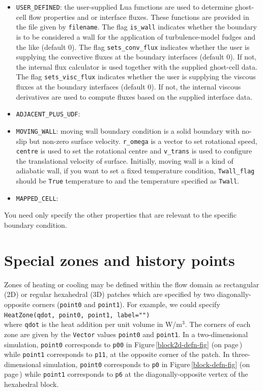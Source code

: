 \begin{itemize}
\begin{itemize}
      \item \texttt{USER\_DEFINED}: the user-supplied Lua functions are used to
        determine ghost-cell flow properties and or interface fluxes.
        These functions are provided in the file given by \texttt{filename}.
        The flag \texttt{is\_wall} indicates whether the boundary is to be considered
        a wall for the application of turbulence-model fudges and the like (default 0).
        The flag \texttt{sets\_conv\_flux} indicates whether the user is supplying
        the convective fluxes at the boundary interfaces (default 0).  
        If not, the internal flux calculator is used together with the supplied ghost-cell data.
        The flag \texttt{sets\_visc\_flux} indicates whether the user is supplying
        the viscous fluxes at the boundary interfaces (default 0).  
        If not, the internal viscous derivatives are used to compute fluxes based on the supplied interface data.
      \item \texttt{ADJACENT\_PLUS\_UDF}:
      \item \texttt{MOVING\_WALL}: moving wall boundary condition is a solid boundary with no-slip
        but non-zero surface velocity. \verb!r_omega! is a vector to set rotational speed, \verb!centre! is used to
        set the rotational centre and \verb!v_trans! is used to configure the translational velocity of surface.
        Initially, moving wall is a kind of adiabatic wall, if you want to set a fixed temperature condition,
        \verb!Twall_flag! should be \verb!True! temperature to and the temperature specified as \verb!Twall!.
      \item \texttt{MAPPED\_CELL}:
    \end{itemize}
\end{itemize}
You need only specify the other properties that are relevant to the specific boundary condition.

\bigskip
\section{Special zones and history points}
\label{sec:special-zones}
% 
Zones of heating or cooling may be defined within the flow domain as rectangular (2D) 
or regular hexahedral (3D) patches which are specified by two diagonally-opposite
corners (\verb!point0! and \verb!point1!).
For example, we could specify\\
\verb!HeatZone(qdot, point0, point1, label="")!\\
where \verb!qdot! is the heat addition per unit volume in W/m$^3$.
The corners of each zone are given by the \verb!Vector! values \verb!point0! and \verb!point1!.
In a two-dimensional simulation, 
\verb!point0! corresponds to \verb!p00! in Figure\,\ref{block2d-defn-fig} (on page\,\pageref{block2d-defn-fig}) 
while \verb!point1! corresponds to \verb!p11!, at the opposite corner of the patch.
In three-dimensional simulation, 
\verb!point0! corresponds to \verb!p0! in Figure\,\ref{block-defn-fig} (on page\,\pageref{block-defn-fig}) 
while \texttt{point1} corresponds to \verb!p6! at the diagonally-opposite vertex of the hexahedral block.

